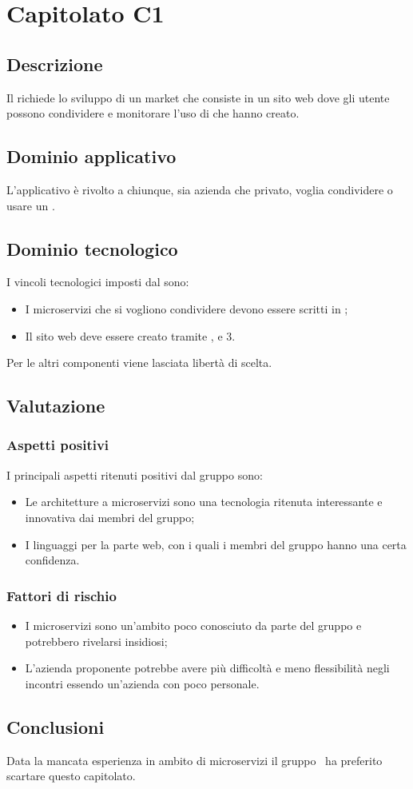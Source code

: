 \documentclass[../StudioDiFattibilita.tex]{subfiles}
\begin{document}
	\section{Capitolato C1}
		\subsection{Descrizione}
		Il  richiede lo sviluppo di un  market che consiste in un sito web dove gli utente possono condividere e monitorare l'uso di  che hanno creato.
		\subsection{Dominio applicativo}
		L'applicativo è rivolto a chiunque, sia azienda che privato, voglia condividere o usare un .
		\subsection{Dominio tecnologico} 
		I vincoli tecnologici imposti dal  sono:
		\begin{itemize}
			\item I microservizi che si vogliono condividere devono essere scritti in ;
			\item Il sito web deve essere creato tramite ,  e 3.
		\end{itemize}
		Per le altri componenti viene lasciata libertà di scelta.
		\subsection{Valutazione}
			\subsubsection{Aspetti positivi}
			I principali aspetti ritenuti positivi dal gruppo sono:
				\begin{itemize}
				\item Le architetture a microservizi sono una tecnologia ritenuta interessante e innovativa dai membri del gruppo; 
				\item I linguaggi per la parte web, con i quali i membri del gruppo hanno una certa confidenza.
			\end{itemize}
			\subsubsection{Fattori di rischio}
				\begin{itemize}
				\item I microservizi sono un'ambito poco conosciuto da parte del gruppo e potrebbero rivelarsi insidiosi;
				\item L'azienda proponente potrebbe avere più difficoltà e meno flessibilità negli incontri essendo un'azienda con poco personale.
			\end{itemize}
			\subsection{Conclusioni}
			Data la mancata esperienza in ambito di microservizi il gruppo \kaleidoscode\ ha preferito scartare questo capitolato.
\end{document}
